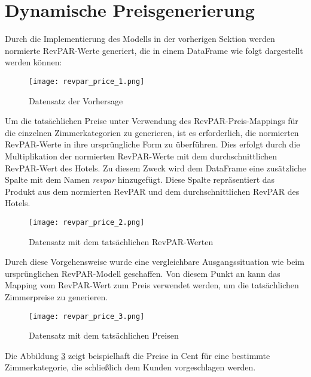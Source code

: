 \section{Dynamische Preisgenerierung}
\label{subsec:revpar_price}
Durch die Implementierung des Modells in der vorherigen Sektion werden normierte RevPAR-Werte generiert, die in einem DataFrame wie folgt dargestellt werden können:

\begin{figure}[h]
    \centering
    \texttt{[image: revpar\_price\_1.png]}
    \caption[Datensatz der Vorhersage]{Datensatz der Vorhersage}
    \label{img:revpar_price_1}
\end{figure}

Um die tatsächlichen Preise unter Verwendung des RevPAR-Preis-Mappings für die einzelnen Zimmerkategorien zu generieren, ist es erforderlich, die normierten RevPAR-Werte in ihre ursprüngliche Form zu überführen. Dies erfolgt durch die Multiplikation der normierten RevPAR-Werte mit dem durchschnittlichen RevPAR-Wert des Hotels. Zu diesem Zweck wird dem DataFrame eine zusätzliche Spalte mit dem Namen \emph{revpar} hinzugefügt. Diese Spalte repräsentiert das Produkt aus dem normierten RevPAR und dem durchschnittlichen RevPAR des Hotels.

\begin{figure}[h]
    \centering
    \texttt{[image: revpar\_price\_2.png]}
    \caption[Datensatz mit dem tatsächlichen RevPAR-Werten]{Datensatz mit dem tatsächlichen RevPAR-Werten}
    \label{img:revpar_price_2}
\end{figure}

Durch diese Vorgehensweise wurde eine vergleichbare Ausgangssituation wie beim ursprünglichen RevPAR-Modell geschaffen. Von diesem Punkt an kann das Mapping vom RevPAR-Wert zum Preis verwendet werden, um die tatsächlichen Zimmerpreise zu generieren.
\newpage
\begin{figure}[h]
    \centering
    \texttt{[image: revpar\_price\_3.png]}
    \caption[Datensatz mit dem tatsächlichen Preisen]{Datensatz mit dem tatsächlichen Preisen}
    \label{img:revpar_price_3}
\end{figure}

Die Abbildung \ref{img:revpar_price_3} zeigt beispielhaft die Preise in Cent für eine bestimmte Zimmerkategorie, die schließlich dem Kunden vorgeschlagen werden.